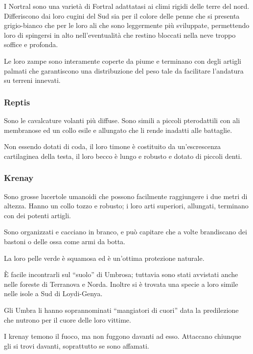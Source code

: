 I Nortral sono una variet\`a di Fortral adattatasi ai climi rigidi
delle terre del nord.  Differiscono dai loro cugini del Sud sia per il
colore delle penne che si presenta grigio-bianco che per le loro ali
che sono leggermente pi\`u sviluppate, permettendo loro di spingersi
in alto nell'eventualit\`a che restino bloccati nella neve troppo
soffice e profonda.

Le loro zampe sono interamente coperte da piume e terminano con degli
artigli palmati che garantiscono una distribuzione del peso tale da
facilitare l'andatura su terreni innevati.

\subsubsection{Reptis} 

Sono le cavalcature volanti pi\`u diffuse. Sono simili a piccoli
pterodattili con ali membranose ed un collo esile e allungato che li
rende inadatti alle battaglie.

Non essendo dotati di coda, il loro timone \`e costituito da
un'escrescenza cartilaginea della testa, il loro becco \`e lungo e
robusto e dotato di piccoli denti.

\subsubsection{Krenay} 

Sono grosse lucertole umanoidi che possono facilmente raggiungere i
due metri di altezza.  Hanno un collo tozzo e robusto; i loro arti
superiori, allungati, terminano con dei potenti artigli.


Sono organizzati e cacciano in branco, e pu\`o capitare che a volte
brandiscano dei bastoni o delle ossa come armi da botta. 

La loro pelle verde \`e squamosa ed \`e un'ottima protezione
naturale.

\`E facile incontrarli sul ``suolo'' di Umbrosa; tuttavia sono stati
avvistati anche nelle foreste di Terranova e Norda. Inoltre si \`e
trovata una specie a loro simile nelle isole a Sud di Loydi-Genya.

Gli Umbra li hanno soprannominati ``mangiatori di cuori'' data la
predilezione che nutrono per il cuore delle loro vittime.

I krenay temono il fuoco, ma non fuggono davanti ad esso. Attaccano
chiunque gli si trovi davanti, soprattutto se sono affamati.

